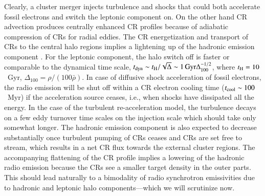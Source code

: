 \documentclass[useAMS,usenatbib]{mn2e}
\begin{document}
\begin{enumerate}
  Clearly, a cluster merger injects turbulence and shocks that could both
  accelerate fossil electrons and switch the leptonic component on. On the other
  hand CR advection produces centrally enhanced CR profiles because of adiabatic
  compression of CRs for radial eddies. The CR energetization and transport of
  CRs to the central halo regions implies a lightening up of the hadronic
  emission component \citep{2011A&A...527A..99E}. For the leptonic component,
  the halo switch off is faster or comparable to the dynamical time scale,
  $t_{\rm dyn} \sim t_{\rm H}/\sqrt{\Delta} \sim 1 \,{\mathrm{Gyr}}
  \Delta_{100}^{-1/2}$, where $t_{\rm H}=10$~Gyr,
  $\Delta_{100}=\rho/(100\bar{\rho})$. In case of diffusive shock acceleration
  of fossil electrons, the radio emission will be shut off within a CR electron
  cooling time ($t_{\mathrm{cool}}\sim100$~Myr) if the acceleration source ceases,
  i.e., when shocks have dissipated all the energy. In the case of the turbulent
  re-acceleration model, the turbulence decays on a few eddy turnover time
  scales on the injection scale which should take only somewhat longer. The
  hadronic emission component is also expected to decrease substantially once
  turbulent pumping of CRs ceases and CRs are set free to stream, which results
  in a net CR flux towards the external cluster regions. The accompanying
  flattening of the CR profile implies a lowering of the hadronic radio emission
  because the CRs see a smaller target density in the outer parts. This should
  lead naturally to a bimodality of radio synchrotron emissivities due to
  hadronic and leptonic halo components---which we will scrutinize now.
\end{enumerate}
\end{document}
